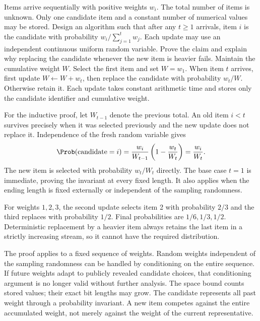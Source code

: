 Items arrive sequentially with positive weights $w_i$. The total number of items is unknown. Only one candidate item and a constant number of numerical values may be stored. Design an algorithm such that after any $t\ge1$ arrivals, item $i$ is the candidate with probability $w_i/\sum_{j=1}^t w_j$. Each update may use an independent continuous uniform random variable. Prove the claim and explain why replacing the candidate whenever the new item is heavier fails.
\solution Maintain the cumulative weight $W$. Select the first item and set $W=w_1$. When item $t$ arrives, first update $W\leftarrow W+w_t$, then replace the candidate with probability $w_t/W$. Otherwise retain it. Each update takes constant arithmetic time and stores only the candidate identifier and cumulative weight.

For the inductive proof, let $W_{t-1}$ denote the previous total. An old item $i<t$ survives precisely when it was selected previously and the new update does not replace it. Independence of the fresh random variable gives
\[
\Prob(\text{candidate}=i)
=\frac{w_i}{W_{t-1}}\left(1-\frac{w_t}{W_t}\right)
=\frac{w_i}{W_t}.
\]
The new item is selected with probability $w_t/W_t$ directly. The base case $t=1$ is immediate, proving the invariant at every fixed length. It also applies when the ending length is fixed externally or independent of the sampling randomness.

For weights $1,2,3$, the second update selects item 2 with probability $2/3$ and the third replaces with probability $1/2$. Final probabilities are $1/6,1/3,1/2$. Deterministic replacement by a heavier item always retains the last item in a strictly increasing stream, so it cannot have the required distribution.

The proof applies to a fixed sequence of weights. Random weights independent of the sampling randomness can be handled by conditioning on the entire sequence. If future weights adapt to publicly revealed candidate choices, that conditioning argument is no longer valid without further analysis. The space bound counts stored values; their exact bit lengths may grow.
\insight The candidate represents all past weight through a probability invariant. A new item competes against the entire accumulated weight, not merely against the weight of the current representative.

